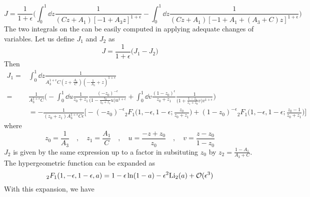\begin{equation*}
J = \frac{1}{1+\epsilon}\Big(\int^1_0\dd z\frac{1}{(Cz + A_1)[-1 + A_3z]^{1+\epsilon}} - 
\int^1_0\dd z\frac{1}{(Cz + A_1)[-1 + A_1  + (A_3 + C)z]^{1+\epsilon} }\Big)
\end{equation*}
The two integrals on the \rhs can be easily computed in applying adequate changes of variables.
Let us define $J_1$ and $J_2$ as
\begin{equation*}
J = \frac{1}{1+\epsilon}\big(J_1-J_2\big)
\end{equation*}
Then
\begin{equation*}
\begin{split}
J_1 = & \int^1_0 \dd z \frac{1}{A_3^{1+\epsilon}C(z + \frac{A_1}{C})(-\frac{1}{A_3} + z)^{1+\epsilon}} 
\\
= &
\frac{1}{A_3^{1+\epsilon}C}\Big(
-\int^1_0 \dd u \frac{1}{z_0 + z_1}\frac{(-z_0)^{-\epsilon}}{\big(1-\frac{z_0}{z_0 + z_1}u\big) u^{1+\epsilon}} +
\int^1_0\dd v \frac{(1-z_0)^{\epsilon}}{z_0 + z_1}\frac{1}{\big(1+ \frac{1-z_0}{z_1 + z_0}v\big)v^{1+\epsilon}}\Big)
\\
& = 
-\frac{1}{(z_0 + z_1 )A_3^{1+\epsilon}C\epsilon}
\Big[-(-z_0)^{-\epsilon}{}_2F_1\big(1,-\epsilon, 1-\epsilon; \frac{z_0}{z_0 + z_1}\big)
+ (1-z_0)^{-\epsilon}{}_2F_1\big(1, -\epsilon, 1-\epsilon; \frac{z_0 -1}{z_0 + z_1}\big)\Big]
\end{split}
\end{equation*}
where
\begin{equation*}
z_0 = \frac{1}{A_3} \quad, \quad z_1 = \frac{A_1}{C}
\quad,\quad
u=\frac{-z + z_0}{z_0}\quad,\quad
v=\frac{z-z_0}{1-z_0}
\end{equation*}
$J_2$ is given by the same expression up to a factor in subsituting $z_0$ by $z_2 = \frac{1 - A_1}{A_3 + C}$. 
The hypergeometric function can be expanded as
\begin{equation*}
{}_2F_1 (1,-\epsilon, 1-\epsilon, a) = 
1-\epsilon\ln(1-a) - \epsilon^2 \mathrm{Li}_2 (a) + \mathcal{O}(\epsilon^3)
\end{equation*}
With this expansion, we have
